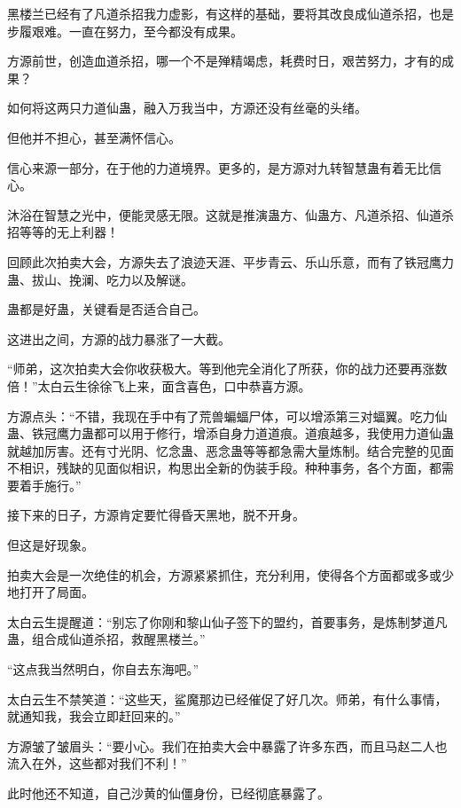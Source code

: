 \begin{this_body}
黑楼兰已经有了凡道杀招我力虚影，有这样的基础，要将其改良成仙道杀招，也是步履艰难。一直在努力，至今都没有成果。

方源前世，创造血道杀招，哪一个不是殚精竭虑，耗费时日，艰苦努力，才有的成果？

如何将这两只力道仙蛊，融入万我当中，方源还没有丝毫的头绪。

但他并不担心，甚至满怀信心。

信心来源一部分，在于他的力道境界。更多的，是方源对九转智慧蛊有着无比信心。

沐浴在智慧之光中，便能灵感无限。这就是推演蛊方、仙蛊方、凡道杀招、仙道杀招等等的无上利器！

回顾此次拍卖大会，方源失去了浪迹天涯、平步青云、乐山乐意，而有了铁冠鹰力蛊、拔山、挽澜、吃力以及解谜。

蛊都是好蛊，关键看是否适合自己。

这进出之间，方源的战力暴涨了一大截。

“师弟，这次拍卖大会你收获极大。等到他完全消化了所获，你的战力还要再涨数倍！”太白云生徐徐飞上来，面含喜色，口中恭喜方源。

方源点头：“不错，我现在手中有了荒兽蝙蝠尸体，可以增添第三对蝠翼。吃力仙蛊、铁冠鹰力蛊都可以用于修行，增添自身力道道痕。道痕越多，我使用力道仙蛊就越加厉害。还有寸光阴、忆念蛊、恶念蛊等等都急需大量炼制。结合完整的见面不相识，残缺的见面似相识，构思出全新的伪装手段。种种事务，各个方面，都需要着手施行。”

接下来的日子，方源肯定要忙得昏天黑地，脱不开身。

但这是好现象。

拍卖大会是一次绝佳的机会，方源紧紧抓住，充分利用，使得各个方面都或多或少地打开了局面。

太白云生提醒道：“别忘了你刚和黎山仙子签下的盟约，首要事务，是炼制梦道凡蛊，组合成仙道杀招，救醒黑楼兰。”

“这点我当然明白，你自去东海吧。”

太白云生不禁笑道：“这些天，鲨魔那边已经催促了好几次。师弟，有什么事情，就通知我，我会立即赶回来的。”

方源皱了皱眉头：“要小心。我们在拍卖大会中暴露了许多东西，而且马赵二人也流入在外，这些都对我们不利！”

此时他还不知道，自己沙黄的仙僵身份，已经彻底暴露了。

\end{this_body}

